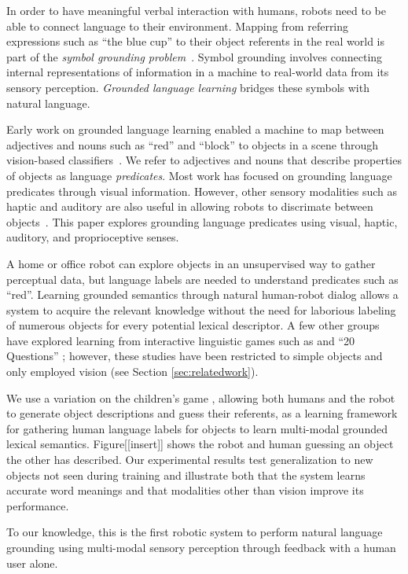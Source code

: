In order to have meaningful verbal interaction with humans, robots need to be able to connect language to their environment.
Mapping from referring expressions such as ``the blue cup'' to their object referents in the real world is part of the \textit{symbol grounding problem}~\cite{harnad:phys90}.
Symbol grounding involves connecting internal representations of information in a machine to real-world data from its sensory perception.
\textit{Grounded language learning} bridges these symbols with natural language.

Early work on grounded language learning enabled a machine to map between adjectives and nouns such as ``red'' and ``block'' to objects in a scene through vision-based classifiers~\cite{roy:evocomm01}.
We refer to adjectives and nouns that describe properties of objects as language \textit{predicates}.
Most work has focused on grounding language predicates through visual information. However, other sensory modalities such as haptic and auditory are also useful in allowing robots to discrimate between objects~\cite{sinapov:icra14}.
This paper explores grounding language predicates using visual, haptic, auditory, and proprioceptive senses. 

A home or office robot can explore objects in an unsupervised way to gather perceptual data, but language labels are needed to understand predicates such as ``red''.
Learning grounded semantics through natural human-robot dialog allows a system to acquire the relevant knowledge without the need for laborious labeling of numerous objects for every potential lexical descriptor.
A few other groups have explored learning from interactive linguistic games such as \ispy and ``20 Questions'' \cite{parde:ijcai15,vogel:aaai10}; however, these studies have been restricted to simple objects and only employed vision (see Section \ref{sec:relatedwork}).

We use a variation on the children's game \ispy, allowing both humans and the robot to generate object descriptions and guess their referents, as a learning framework for gathering human language labels for objects to learn multi-modal grounded lexical semantics.
Figure[[insert]] shows the robot and human guessing an object the other has described.
Our experimental results test generalization to new objects not seen during training and illustrate both that the system learns accurate word meanings and that modalities other than vision improve its performance.

To our knowledge, this is the first robotic system to perform natural language grounding using multi-modal sensory perception through feedback with a human user alone.